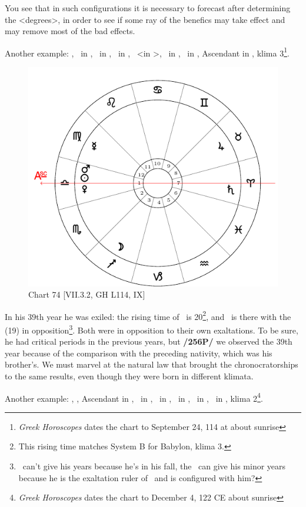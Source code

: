 You see that in such configurations it is necessary to forecast after determining the <degrees>, in order to see if some ray of the benefics may take effect and may remove most of the bad effects.

\newpage
Another example: \Sun, \Venus\, in \Libra, \Saturn\, in \Aries, \Jupiter\, in \Taurus, \Mars\, <in \Libra>, \Mercury\, in \Virgo, \Moon\, in \Sagittarius, Ascendant in \Libra, klima 3\footnote{\textit{Greek Horoscopes} dates the chart to September 24, 114 at about sunrise}. 

\begin{figure}
\centering
\vspace{-20pt}
\includegraphics[width=.68\textwidth]{charts/7_3_2}
\caption{Chart 74 [VII.3.2, GH L114, IX]}
\label{fig:chart74}
\end{figure}

In his 39th year he was exiled: the rising time of \Aries\, is 20\footnote{This rising time matches System B for Babylon, klima 3.}, and \Saturn\, is there with the \Sun\, (19) in opposition\footnote{\Saturn\, can't give his years because he's in his fall, the \Sun\, can give his minor years because he is the exaltation ruler of \Aries\, and is configured with him?}. Both were in opposition to their own exaltations. To be sure, he had critical periods in the previous years, but \textbf{/256P/} we observed the 39th year because of the comparison with the preceding nativity, which was his brother’s. We must marvel at the natural law that brought the chronocratorships to the same results, even though they were born in different klimata.

\newpage
Another example: \Sun, \Mercury, Ascendant in \Sagittarius, \Moon\, in \Cancer, \Saturn\, in \Leo, \Jupiter\, in
\Capricorn, \Mars\, in \Aquarius, \Venus\, in \Scorpio, klima 2\footnote{\textit{Greek Horoscopes} dates the chart to December 4, 122 CE about sunrise}.

